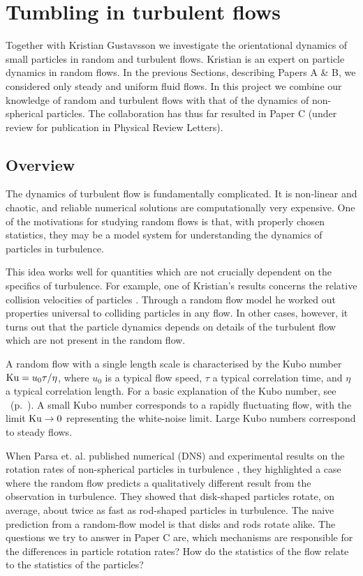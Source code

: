 \documentclass[thesis.tex]{subfiles}
\begin{document}
\chapter{Tumbling in turbulent flows}

Together with Kristian Gustavsson we investigate the orientational dynamics of small particles in random and turbulent flows. 
Kristian is an expert on particle dynamics in random flows. In the previous Sections, describing Papers A \& B, we considered only steady and uniform fluid flows. In this project we combine our knowledge of random and turbulent flows with that of the dynamics of non-spherical particles. The collaboration has thus far resulted in Paper C (under review for publication in Physical Review Letters).

\section{Overview}

The dynamics of turbulent flow is fundamentally complicated. It is non-linear and chaotic, and reliable numerical solutions are computationally very expensive. One of the motivations for studying random flows is that, with properly chosen statistics, they may be a model system for understanding the dynamics of particles in turbulence.

This idea works well for quantities which are not crucially dependent on the specifics of turbulence. For example, one of Kristian's results concerns the relative collision velocities of particles \cite{gustavsson2011}. Through a random flow model he worked out properties universal to colliding particles in any flow. In other cases, however, it turns out that the particle dynamics depends on details of the turbulent flow which are not present in the random flow. 

A random flow with a single length scale is characterised by the Kubo number $\mbox{Ku} = u_0 \tau/\eta$, where $u_0$ is a typical flow speed, $\tau$ a typical correlation time, and $\eta$ a typical correlation length. For a basic explanation of the Kubo number, see ~(p.~\pageref{sec:context}). A small Kubo number corresponds to a rapidly fluctuating flow, with the limit $\mbox{Ku}\to0$ representing the white-noise limit. Large Kubo numbers correspond to steady flows.

When Parsa et. al. published numerical (DNS) and experimental results on the rotation rates of non-spherical particles in turbulence \cite{parsa2012}, they highlighted a case where the random flow predicts a qualitatively different result from the observation in turbulence. They showed that disk-shaped particles rotate, on average, about twice as fast as rod-shaped particles in turbulence. The naive prediction from a random-flow model is that disks and rods rotate alike. The questions we try to answer in Paper C are, which mechanisms are responsible for the differences in particle rotation rates? How do the statistics of the flow relate to the statistics of the particles? 
\end{document}
